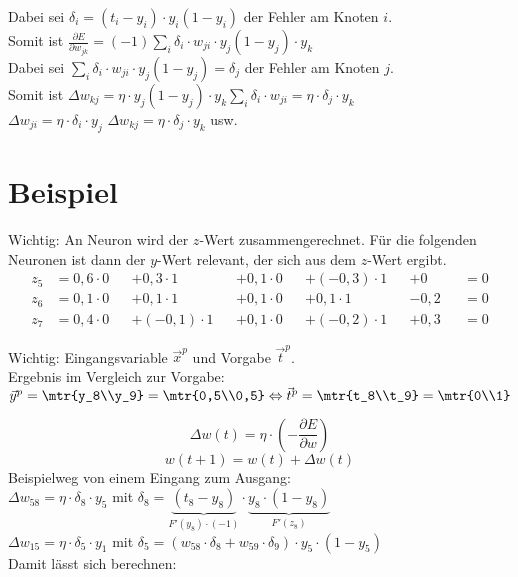 Dabei sei $\boxed{ \delta_i =(t_i-y_i) \cdot y_i(1-y_i)}$ der Fehler am Knoten $i$.\\
Somit ist $\frac{\partial E}{\partial w_{jk}}=(-1) \sum_i \delta_i \cdot w_{ji} \cdot y_j(1-y_j) \cdot y_k$\\
Dabei sei $\sum_i \delta_i \cdot w_{ji} \cdot y_j(1-y_j) = \delta_j$ der Fehler am Knoten $j$.\\
Somit ist $\Delta w_{kj}=\eta \cdot y_j(1-y_j) \cdot y_k \sum_i \delta _i \cdot w_{ji} = \eta \cdot \delta_j \cdot y_k$\\
$\boxed{\Delta w_{ji}=\eta \cdot \delta_i \cdot y_j}$
$\boxed{\Delta w_{kj}=\eta \cdot \delta_j \cdot y_k}$ usw.






\section{Beispiel}
Wichtig: An Neuron wird der $z$-Wert zusammengerechnet. Für die folgenden Neuronen ist dann der $y$-Wert relevant, der sich aus dem $z$-Wert ergibt.
\begin{align*}
z_5 &= 0,6\cdot 0 &&+ 0,3 \cdot 1 &&+ 0,1 \cdot 0 &&+ (-0,3) \cdot 1 &&+ 0 &&= 0\\
z_6 &= 0,1\cdot 0 &&+ 0,1 \cdot 1 &&+ 0,1 \cdot 0 &&+ 0,1 \cdot 1 &&-0,2 &&= 0\\
z_7 &= 0,4\cdot 0 &&+ (-0,1) \cdot 1 &&+ 0,1 \cdot 0 &&+ (-0,2) \cdot 1 &&+ 0,3 &&= 0
\end{align*}

Wichtig: Eingangsvariable $\vec{x}^p$ und Vorgabe $\vec{t}^p$.\\
Ergebnis im Vergleich zur Vorgabe:\\
$\vec{y}^p=\mtr{y_8\\y_9}=\mtr{0,5\\0,5} \Leftrightarrow \vec{t}^p = \mtr{t_8\\t_9}=\mtr{0\\1}$
\begin{center}
\end{center}
$$\Delta w(t) = \eta \cdot \left( -\frac{\partial E}{\partial w}\right)$$
$$w(t+1) = w(t) + \Delta w(t)$$
Beispielweg von einem Eingang zum Ausgang:\\
$\Delta w_{58}=\eta \cdot \delta_8 \cdot y_5$ mit $\delta_8 = \underbrace{(t_8-y_8)}_{F'(y_8)\cdot (-1)} \cdot \underbrace{y_8 \cdot (1-y_8)}_{F'(z_8)}$\\
$\Delta w_{15}=\eta\cdot \delta_5 \cdot y_1$ mit $\delta_5 = (w_{58}\cdot \delta_8 + w_{59} \cdot \delta_9) \cdot y_5 \cdot (1-y_5)$\\
Damit lässt sich berechnen:
